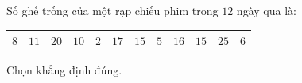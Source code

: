 \begin{ex}
Số ghế trống của một rạp chiếu phim trong $12$ ngày qua là:
\begin{center}
\begin{tabular}{|c|c|c|c|c|c|c|c|c|c|c|c|}\hline
$8$ & $11$ & $20$ & $10$ & $2$ & $17$ & $15$ & $5$ & $16$ & $15$ & $25$ & $6$\\\hline
\end{tabular}
\end{center}
Chọn khẳng định đúng.
\end{ex}

